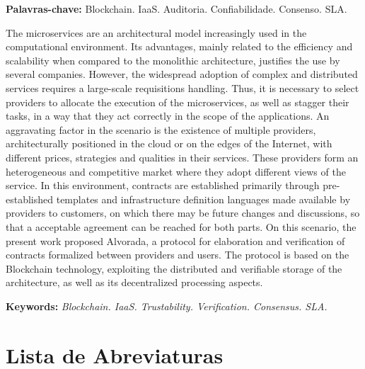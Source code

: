 \noindent \textbf{Palavras-chave:} Blockchain. IaaS. Auditoria. Confiabilidade. Consenso. SLA.

 

\noindent The microservices are an architectural model increasingly used in the computational environment. Its advantages, mainly related to the efficiency and scalability when compared to the monolithic architecture, justifies the use by several companies.
%
However, the widespread adoption of complex and distributed services requires a large-scale requisitions handling.
%
Thus, it is necessary to select providers to allocate the execution of the microservices, as well as stagger their tasks, in a way that they act correctly in the scope of the applications.
%
An aggravating factor in the scenario is the existence of multiple providers, architecturally positioned in the cloud or on the edges of the Internet, with different prices, strategies and qualities in their services.
%
These providers form an heterogeneous and competitive market where they adopt different views of the service.
%
In this environment, contracts are established primarily through pre-established templates and infrastructure definition languages made available by providers to customers, on which there may be future changes and discussions, so that a acceptable agreement can be reached for both parts.
%
On this scenario, the present work proposed Alvorada, a protocol for elaboration and verification of contracts formalized between providers and users.
%
The protocol is based on the Blockchain technology, exploiting the distributed and verifiable storage of the architecture, as well as its decentralized processing aspects.

\noindent \textbf{Keywords:} \textit{Blockchain. IaaS. Trustability. Verification. Consensus. SLA.}

\tableofcontents
\listoffigures
\listoftables
\newpage
\chapter*{Lista de Abreviaturas\hfill} 


\newpage
\pagestyle{myheadings}
